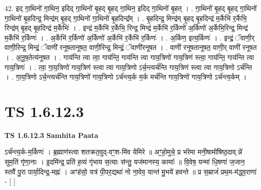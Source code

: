 \documentclass[17pt]{extarticle}
\begin{document}
42. इद् गा॒थिनो॑ गा॒थिन॒ इदिद् गा॒थिनो॑ बृ॒हद् बृ॒हद् गा॒थिन॒ इदिद् गा॒थिनो॑ बृ॒हत् । . गा॒थिनो॑ बृ॒हद् बृ॒हद् गा॒थिनो॑ गा॒थिनो॑ बृ॒हदिन्द्र॒ मिन्द्र॑म् बृ॒हद् गा॒थिनो॑ गा॒थिनो॑ बृ॒हदिन्द्र᳚म् । . बृ॒हदिन्द्र॒ मिन्द्र॑म् बृ॒हद् बृ॒हदिन्द्र॑ म॒र्केभि॑ र॒र्केभि॒ रिन्द्र॑म् बृ॒हद् बृ॒हदिन्द्र॑ म॒र्केभिः॑ । . इन्द्र॑ म॒र्केभि॑ र॒र्केभि॒ रिन्द्र॒ मिन्द्र॑ म॒र्केभि॑ र॒र्किणो॑ अ॒र्किणो॑ अ॒र्केभि॒रिन्द्र॒ मिन्द्र॑ म॒र्केभि॑ र॒र्किणः॑ । . अ॒र्केभि॑ र॒र्किणो॑ अ॒र्किणो॑ अ॒र्केभि॑ र॒र्केभि॑ र॒र्किणः॑ । . अ॒र्किण॒ इत्य॒र्किणः॑ । . इन्द्रं॒ ॅवाणी॒र् वाणी॒रिन्द्र॒ मिन्द्रं॒ ॅवाणी॑ रनूषतानूषत॒ वाणी॒रिन्द्र॒ मिन्द्रं॒ ॅवाणी॑रनूषत । . वाणी॑ रनूषतानूषत॒ वाणी॒र् वाणी॑ रनूषत । . अ॒नू॒ष॒तेत्य॑नूषत । . गाय॑न्ति त्वा त्वा॒ गाय॑न्ति॒ गाय॑न्ति त्वा गाय॒त्रिणो॑ गाय॒त्रिण॑ स्त्वा॒ गाय॑न्ति॒ गाय॑न्ति त्वा गाय॒त्रिणः॑ । . त्वा॒ गा॒य॒त्रिणो॑ गाय॒त्रिण॑ स्त्वा त्वा गाय॒त्रिणो ऽर्च॒न्त्यर्च॑न्ति गाय॒त्रिण॑ स्त्वा त्वा गाय॒त्रिणो ऽर्च॑न्ति । . गा॒य॒त्रिणो ऽर्च॒न्त्यर्च॑न्ति गाय॒त्रिणो॑ गाय॒त्रिणो ऽर्च॑न्त्य॒र्क म॒र्क मर्च॑न्ति गाय॒त्रिणो॑ गाय॒त्रिणो ऽर्च॑न्त्य॒र्कम् । \newline
\pagebreak
{}

\section{ TS 1.6.12.3 }

\textbf{TS 1.6.12.3 } \newline
\textbf{Samhita Paata} \newline

ऽर्च॑न्त्य॒र्क-म॒र्किणः॑ । ब्र॒ह्माण॑स्त्वा शतक्रत॒वुद्-वꣳ॒॒श-मि॑व येमिरे ॥ अꣳ॒॒हो॒मुचे॒ प्र भ॑रेमा मनी॒षामो॑षिष्ठ॒दाव्.न्ने॑ सुम॒तिं गृ॑णा॒नाः । इ॒दमि॑न्द्र॒ प्रति॑ ह॒व्यं गृ॑भाय स॒त्याः स॑न्तु॒ यज॑मानस्य॒ कामाः᳚ ॥ वि॒वेष॒ यन्मा॑ धि॒षणा॑ ज॒जान॒ स्तवै॑ पु॒रा पार्या॒दिन्द्र॒-मह्नः॑ । अꣳह॑सो॒ यत्र॑ पी॒पर॒द्यथा॑ नो ना॒वेव॒ यान्त॑ मु॒भये॑ हवन्ते ॥ प्र स॒म्राजं॑ प्रथ॒म-म॑द्ध्व॒राणा॑ - [ ] \newline
\end{document}
